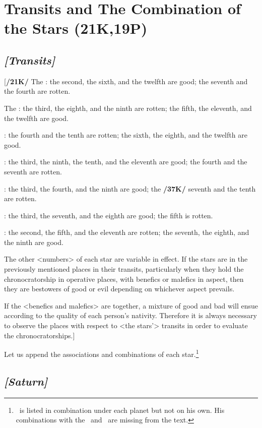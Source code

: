 \section{Transits and The Combination of the Stars (21K,19P)}

\subsection{\textit{[Transits]}}
[\textbf{/21K/}
The \Sun: the second, the sixth, and the twelfth are good; the seventh and the fourth are rotten.

The \Moon: the third, the eighth, and the ninth are rotten; the fifth, the eleventh, and the twelfth are good.

\Saturn: the fourth and the tenth are rotten; the sixth, the eighth, and the twelfth are good.

\Jupiter: the third, the ninth, the tenth, and the eleventh are good; the fourth and the seventh are rotten.

\Mars: the third, the fourth, and the ninth are good; the \textbf{/37K/} seventh and the tenth are rotten.

\Venus: the third, the seventh, and the eighth are good; the fifth is rotten.

\Mercury: the second, the fifth, and the eleventh are rotten; the seventh, the eighth, and the ninth are good.

\mndl[0.2cm]
The other <numbers> of each star are variable in effect.
If the stars are in the previously mentioned places in their transits, particularly when they hold the chronocratorship in operative places, with benefics or malefics in aspect, then they are bestowers of good or evil depending on whichever aspect prevails. 

\mnm[0.3cm]
If the <benefics and malefics> are together, a mixture of good and bad will ensue according to the quality of each person’s nativity. Therefore it is always necessary to
observe the places with respect to <the stars’> transits in order to evaluate the chronocratorships.]

Let us append the associations and combinations of each star.\enlargethispage{2\baselineskip}\footnote{\Mars\, is listed in combination under each planet but not on his own. His combinations with the \Sun\, and \Moon\, are missing from the text.}

\secbr
{}
\subsection{\textit{[Saturn]}}

